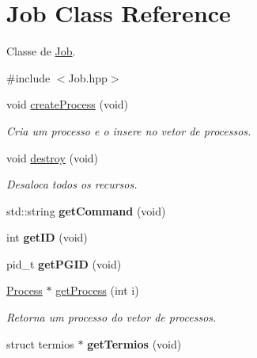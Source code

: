 \hypertarget{classJob}{
\section{Job Class Reference}
\label{classJob}
}


Classe de \hyperlink{classJob}{Job}.  




{\ttfamily \#include $<$Job.hpp$>$}

\begin{DoxyCompactItemize}
\item 
\hypertarget{classJob_a5c8a3cd7594bc9d733b2cc96aa1d3048}{
void \hyperlink{classJob_a5c8a3cd7594bc9d733b2cc96aa1d3048}{createProcess} (void)}
\label{classJob_a5c8a3cd7594bc9d733b2cc96aa1d3048}

\begin{DoxyCompactList}\small\item\em Cria um processo e o insere no vetor de processos. \end{DoxyCompactList}\item 
\hypertarget{classJob_a2db562106fecee581006e4f955170d48}{
void \hyperlink{classJob_a2db562106fecee581006e4f955170d48}{destroy} (void)}
\label{classJob_a2db562106fecee581006e4f955170d48}

\begin{DoxyCompactList}\small\item\em Desaloca todos os recursos. \end{DoxyCompactList}\item 
\hypertarget{classJob_a4d30963a5021100ed0e42999b84d4975}{
std::string {\bfseries getCommand} (void)}
\label{classJob_a4d30963a5021100ed0e42999b84d4975}

\item 
\hypertarget{classJob_a240a158e548e4d5b5801088a9b762aa8}{
int {\bfseries getID} (void)}
\label{classJob_a240a158e548e4d5b5801088a9b762aa8}

\item 
\hypertarget{classJob_a27e1e223f7fa7ab1e8af9b982ac3e7fb}{
pid\_\-t {\bfseries getPGID} (void)}
\label{classJob_a27e1e223f7fa7ab1e8af9b982ac3e7fb}

\item 
\hyperlink{classProcess}{Process} $\ast$ \hyperlink{classJob_a1e03c533c695a6dc59d233eeca764233}{getProcess} (int i)
\begin{DoxyCompactList}\small\item\em Retorna um processo do vetor de processos. \end{DoxyCompactList}\item 
\hypertarget{classJob_a12204776a5d6a7f6cc525de61be9974f}{
struct termios $\ast$ {\bfseries getTermios} (void)}
\label{classJob_a12204776a5d6a7f6cc525de61be9974f}


\end{DoxyCompactItemize}

